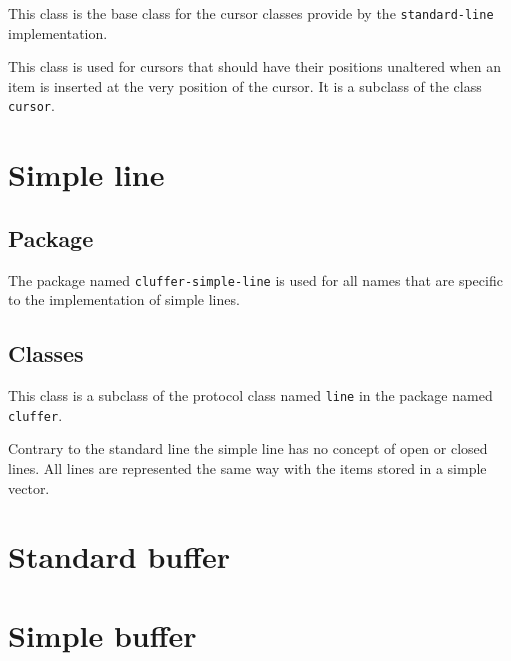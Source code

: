 This class is the base class for the cursor classes provide by the
\texttt{standard-line} implementation.


This class is used for cursors that should have their positions
unaltered when an item is inserted at the very position of the
cursor.   It is a subclass of the class \texttt{cursor}.

\section{Simple line}

\subsection{Package}

The package named \texttt{cluffer-simple-line} is used for all names
that are specific to the implementation of simple lines.

\subsection{Classes}


This class is a subclass of the protocol class named \texttt{line} in
the package named \texttt{cluffer}.

Contrary to the standard line  the simple
line has no concept of open or closed lines.  All lines are
represented the same way with the items stored in a simple
\commonlisp{} vector.

\section{Standard buffer}

\section{Simple buffer}
